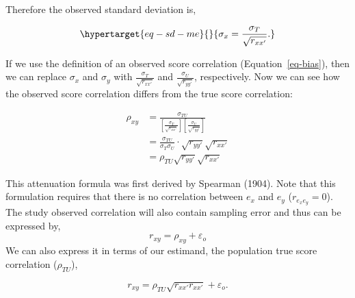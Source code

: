 \documentclass[
  letterpaper,
  DIV=11,
  numbers=noendperiod]{scrreprt}
\begin{document}
Therefore the observed standard deviation is,

\begin{equation}\protect\hypertarget{eq-sd-me}{}{
\sigma_x = \frac{\sigma_{T}}{\sqrt{r_{xx'}}}.
}\label{eq-sd-me}\end{equation}

If we use the definition of an observed score correlation
(Equation~\ref{eq-bias}), then we can replace \(\sigma_x\) and
\(\sigma_y\) with \(\frac{\sigma_{T}}{\sqrt{r_{xx'}}}\) and
\(\frac{\sigma_{U}}{\sqrt{r_{yy'}}}\), respectively. Now we can see how
the observed score correlation differs from the true score correlation:

\begin{align}
\rho_{xy} &= \frac{\sigma_{T U}}{\left[\frac{\sigma_{T}}{\sqrt{r_{xx'}}} \right] \left[ \frac{\sigma_{U}}{\sqrt{r_{yy'}}} \right] } 
\\ &= \frac{\sigma_{T U}}{\sigma_{T}\sigma_{U}} \cdot \sqrt{r_{yy'}}\sqrt{r_{xx'}}
\\ &= \rho_{TU} \sqrt{r_{yy'}}\sqrt{r_{xx'}} 
\end{align}

This attenuation formula was first derived by Spearman (1904). Note that
this formulation requires that there is no correlation between \(e_x\)
and \(e_y\) (\(r_{e_xe_y}=0\)). The study observed correlation will also
contain sampling error and thus can be expressed by, \[
r_{xy} = \rho_{xy} + \varepsilon_o
\] We can also express it in terms of our estimand, the population true
score correlation (\(\rho_{TU}\)),

\[
r_{xy} = \rho_{TU}\sqrt{r_{xx'}r_{xx'}} + \varepsilon_o.
\]
\end{document}
